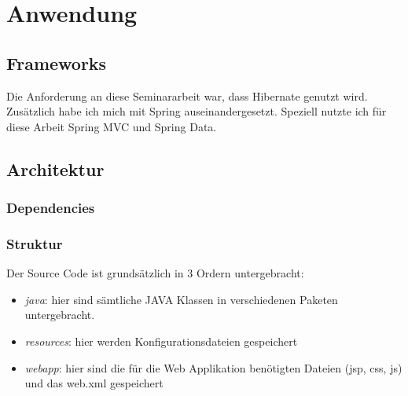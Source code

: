 \chapter{Anwendung}
\label{sec:Anwendung}

\section{Frameworks}
Die Anforderung an diese Seminararbeit war, dass Hibernate genutzt wird.
Zusätzlich habe ich mich mit Spring auseinandergesetzt. Speziell nutzte ich für diese Arbeit Spring MVC und Spring Data.

\section{Architektur}

\subsection{Dependencies}


\subsection{Struktur}
Der Source Code ist grundsätzlich in 3 Ordern untergebracht:
\begin{itemize}
	\item \emph{java}: hier sind sämtliche JAVA Klassen in verschiedenen Paketen untergebracht.
	\item \emph{resources}: hier werden Konfigurationsdateien gespeichert
	\item \emph{webapp}: hier sind die für die Web Applikation benötigten Dateien (jsp, css, js) und das web.xml gespeichert
\end{itemize}

